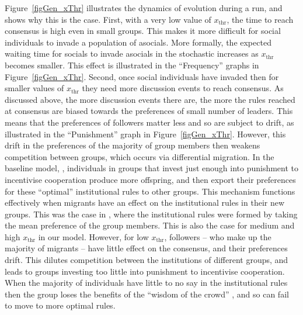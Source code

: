 \documentclass{rstb}
\begin{document}
\begin{linenumbers}
Figure~\ref{figGen_xThr} illustrates the dynamics of evolution during a run, and shows why this is the case. First, with a very low value of $x_\mathrm{thr}$, the time to reach consensus is high even in small groups. This makes it more difficult for social individuals to invade a population of asocials. More formally, the expected waiting time for socials to invade asocials in the stochastic increases as $x_\mathrm{thr}$ becomes smaller. This effect is illustrated in the ``Frequency'' graphs in Figure~\ref{figGen_xThr}. Second, once social individuals have invaded then for smaller values of $x_\mathrm{thr}$ they need more discussion events to reach consensus. As discussed above, the more discussion events there are, the more the rules reached at consensus are biased towards the preferences of small number of leaders. This means that the preferences of followers matter less and so are subject to drift, as illustrated in the ``Punishment'' graph in Figure~\ref{figGen_xThr}. However, this drift in the preferences of the majority of group members then weakens competition between groups, which occurs via differential migration. In the baseline model, \cite{Powers:2013:a}, individuals in groups that invest just enough into punishment to incentivise cooperation produce more offspring, and then export their preferences for these ``optimal'' institutional rules to other groups. This mechanism functions effectively when migrants have an effect on the institutional rules in their new groups. This was the case in \cite{Powers:2013:a}, where the institutional rules were formed by taking the mean preference of the group members. This is also the case for medium and high $x_\mathrm{thr}$ in our model. However, for low $x_\mathrm{thr}$, followers -- who make up the majority of migrants -- have little effect on the consensus, and their preferences drift. This dilutes competition between the institutions of different groups, and leads to groups investing too little into punishment to incentivise cooperation. When the majority of individuals have little to no say in the institutional rules then the group loses the benefits of the ``wisdom of the crowd'' \cite{Ober:2008:a}, and so can fail to move to more optimal rules. 


\end{linenumbers}
\end{document}

